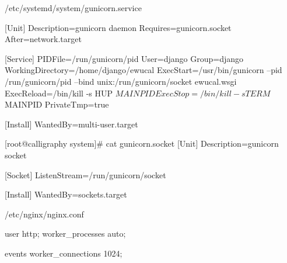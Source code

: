 
/etc/systemd/system/gunicorn.service

[Unit]
Description=gunicorn daemon
Requires=gunicorn.socket
After=network.target

[Service]
PIDFile=/run/gunicorn/pid
User=django
Group=django
WorkingDirectory=/home/django/ewucal
ExecStart=/usr/bin/gunicorn --pid /run/gunicorn/pid --bind unix:/run/gunicorn/socket ewucal.wsgi
ExecReload=/bin/kill -s HUP $MAINPID
ExecStop=/bin/kill -s TERM $MAINPID
PrivateTmp=true

[Install]
WantedBy=multi-user.target



[root@calligraphy system]# cat gunicorn.socket 
[Unit]
Description=gunicorn socket

[Socket]
ListenStream=/run/gunicorn/socket

[Install]
WantedBy=sockets.target




/etc/nginx/nginx.conf

user http;
worker_processes auto;

events {
    worker_connections  1024;
}


